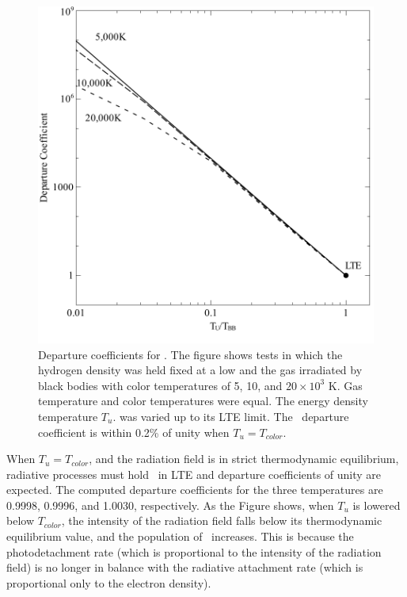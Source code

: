 \begin{figure}
\centering
\label{fig:Hmi_vs_U}
\includegraphics[scale=0.7]{Hmi_vs_U}
\caption[\hminus\ departure coefficients vs radiation energy density]{Departure coefficients for \hminus.  The figure shows tests in which
the hydrogen density was held fixed at a low and the gas irradiated by black
bodies with color temperatures of 5, 10, and $20 \times 10^3$ K.  Gas temperature
and color temperatures were equal. The energy density temperature $T_u$. was
varied up to its LTE limit.  The \hminus\ departure coefficient is within 0.2\%
of unity when $T_u = T_{color}$.}
\end{figure}

When $T_u = T_{color}$, and the radiation field is in strict thermodynamic
equilibrium, radiative processes must hold \hminus\ in LTE and departure
coefficients of unity are expected.  The computed departure coefficients
for the three temperatures are 0.9998, 0.9996, and 1.0030, respectively.
As the Figure shows, when $T_u$ is lowered below $T_{color}$, the intensity of the
radiation field falls below its thermodynamic equilibrium value, and the
population of \hminus\ increases.  This is because the photodetachment rate (which
is proportional to the intensity of the radiation field) is no longer in
balance with the radiative attachment rate (which is proportional only to
the electron density).

